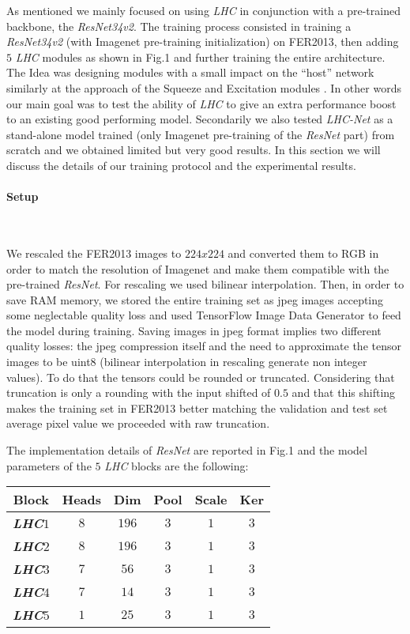\documentclass[fleqn,10pt]{SelfArx}
\begin{document}
As mentioned we mainly focused on using \textit{LHC} in conjunction with a pre-trained backbone, the \textit{ResNet34v2}. The training process consisted in training a \textit{ResNet34v2} (with Imagenet pre-training initialization) on FER2013, then adding $5$ \textit{LHC} modules as shown in Fig.1 and further training the entire architecture. The Idea was designing modules with a small impact on the ``host'' network similarly at the approach of the Squeeze and Excitation modules \cite{hu2018squeeze}. In other words our main goal was to test the ability of \textit{LHC} to give an extra performance boost to an existing good performing model. Secondarily we also tested \textit{LHC-Net} as a stand-alone model trained (only Imagenet pre-training of the \textit{ResNet} part) from scratch and we obtained limited but very good results. In this section we will discuss the details of our training protocol and the experimental results.
\

\paragraph{Setup}

\

We rescaled the FER2013 images to $224x224$ and converted them to RGB in order to match the resolution of Imagenet and make them compatible with the pre-trained \textit{ResNet}. For rescaling we used bilinear interpolation.
Then, in order to save RAM memory, we stored the entire training set as jpeg images accepting some neglectable quality loss and used TensorFlow Image Data Generator to feed the model during training. Saving images in jpeg format implies two different quality losses: the jpeg compression itself and the need to approximate the tensor images to be uint8 (bilinear interpolation in rescaling generate non integer values). To do that the tensors could be rounded or truncated. Considering that truncation is only a rounding with the input shifted of $0.5$ and that this shifting makes the training set in FER2013 better matching the validation and test set average pixel value we proceeded with raw truncation.

The implementation details of \textit{ResNet} are reported in Fig.1 and the model parameters of the $5$ \textit{LHC} blocks are the following:
\begin{center}
\begin{tabular}{||c | c | c | c | c | c||}  
 \hline
 \textbf{Block}  & \textbf{Heads} & \textbf{Dim} & \textbf{Pool} & \textbf{Scale} & \textbf{Ker}\\ 
 \hline
 \hline
\textbf{\textit{LHC}$1$} & $8$ & $196$ & $3$ &$1$ &$3$ \\
 \hline
 \hline
\textbf{\textit{LHC}$2$} & $8$ & $196$ & $3$ &$1$ &$3$ \\
 \hline
 \hline
\textbf{\textit{LHC}$3$} & $7$ & $56$ & $3$ &$1$ &$3$ \\
 \hline
 \hline
\textbf{\textit{LHC}$4$} & $7$ & $14$ & $3$ &$1$ &$3$ \\
 \hline
 \hline
\textbf{\textit{LHC}$5$} & $1$ & $25$ & $3$ &$1$ &$3$ \\
 \hline
\end{tabular}
\end{center}
\end{document}
